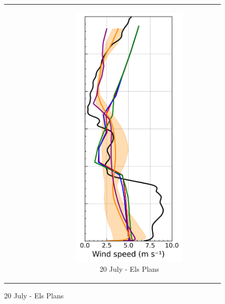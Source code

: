\begin{figure}[hbtp]
{\begin{tabular}{@{}cccc@{}}
\begin{subfigure}[t]{0.289\textwidth}
        \end{subfigure} &
        \begin{subfigure}[t]{0.283\textwidth}
            \caption{20 July - Els Plans}
            \includegraphics[width=\textwidth]{images/chap6/profiles/profile_elsplans_wind_speed_2007_.png}

\end{subfigure}
\end{tabular}}
\end{figure}
